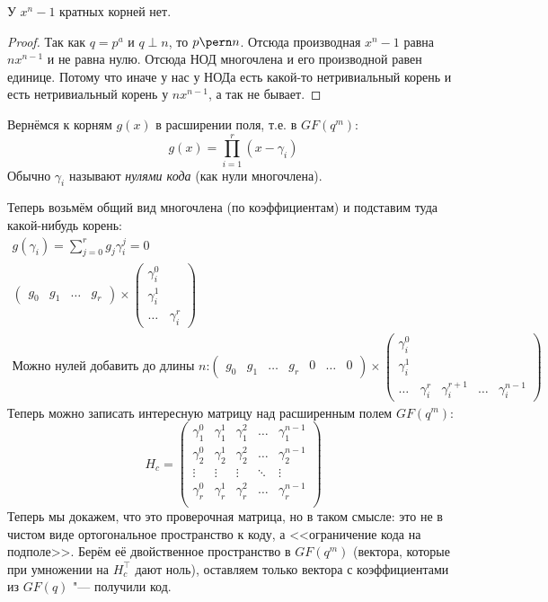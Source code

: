 \begin{lemma}
	У $x^n-1$ кратных корней нет.
\end{lemma}
\begin{proof}
	Так как $q=p^a$ и $q \perp n$, то $p \pern n$.
	Отсюда производная $x^n-1$ равна $nx^{n-1}$ и не равна нулю.
	Отсюда НОД многочлена и его производной равен единице.
	Потому что иначе у нас у НОДа есть какой-то нетривиальный корень
	и есть нетривиальный корень у $nx^{n-1}$, а так не бывает.
\end{proof}

Вернёмся к корням $g(x)$ в расширении поля, т.е. в $GF(q^m)$:
\[
g(x) = \prod\limits_{i=1}^r (x-\gamma_i)
\]
Обычно $\gamma_i$ называют \textit{нулями кода} (как нули многочлена).

Теперь возьмём общий вид многочлена (по коэффициентам) и подставим туда какой-нибудь корень:
\begin{gather*}
g(\gamma_i) = \sum\limits_{j=0}^r g_j \gamma_i^j = 0
\\
\begin{pmatrix}
g_0 & g_1 & \dots & g_r
\end{pmatrix}
\times
\begin{pmatrix}
\gamma_i^0 \\ \gamma_i^1 \\ \dots & \gamma_i^r
\end{pmatrix}
\\
\text{Можно нулей добавить до длины $n$:}
\begin{pmatrix}
g_0 & g_1 & \dots & g_r & 0 & \dots & 0
\end{pmatrix}
\times
\begin{pmatrix}
\gamma_i^0 \\ \gamma_i^1 \\ \dots & \gamma_i^r & \gamma_i^{r+1} & \dots & \gamma_i^{n-1}
\end{pmatrix}
\end{gather*}
Теперь можно записать интересную матрицу над расширенным полем $GF(q^m)$:
\[
H_c = \begin{pmatrix}
\gamma_1^0 & \gamma_1^1 & \gamma_1^2 & \dots & \gamma_1^{n-1} \\
\gamma_2^0 & \gamma_2^1 & \gamma_2^2 & \dots & \gamma_2^{n-1} \\
\vdots & \vdots & \vdots & \ddots & \vdots \\
\gamma_r^0 & \gamma_r^1 & \gamma_r^2 & \dots & \gamma_r^{n-1} \\
\end{pmatrix}
\]
Теперь мы докажем, что это проверочная матрица, но в таком смысле:
это не в чистом виде ортогональное пространство к коду,
а <<ограничение кода на подполе>>.
Берём её двойственное пространство в $GF(q^m)$ (вектора, которые при умножении
на $H_c^\top$ дают ноль), оставляем только вектора с коэффициентами из $GF(q)$ "--- получили код.

